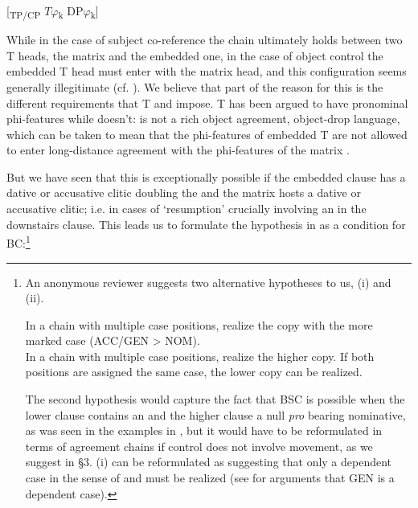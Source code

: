 \documentclass[output=paper]{langsci/langscibook}
\begin{document}
\ea%
    \label{ex:alexiadou:54}
    \textsubscript{} [\textsubscript{TP/CP}    $T\varphi $\textsubscript{k}    DP$\varphi $\textsubscript{k}]  
\z
 
While in the case of subject co-reference the  chain ultimately holds between two T heads, the matrix and the embedded one, in the case of object control the embedded T head must enter  with the matrix  head, and this configuration seems generally illegitimate (cf. \citealt{Kayne1989}). We believe that part of the reason for this is the different requirements that T and  impose. T has been argued to have pronominal phi-features while  doesn’t:  is not a rich object agreement, object-drop language, which can be taken to mean that the phi-features of embedded T are not allowed to enter long-distance agreement with the phi-features of the matrix . 

But we have seen that this is exceptionally possible if the embedded clause has a dative or accusative clitic doubling the  and the matrix  hosts a dative or accusative clitic; i.e. in cases of ‘resumption’ crucially involving an  in the downstairs clause. This leads us to formulate the hypothesis in  as a condition for BC:\footnote{An anonymous reviewer suggests two alternative hypotheses to us, (i) and (ii).

\ea \glt In a chain with multiple case positions, realize the copy with the more marked case (ACC\slash GEN > NOM).\\
\z
\ea \glt In a chain with multiple case positions, realize the higher copy. If both positions are assigned the same case, the lower copy can be realized.\\
\z    

The second hypothesis would capture the fact that BSC is possible when the lower clause contains an  and the higher clause a null \textit{pro} bearing nominative, as was seen in the examples in , but it would have to be reformulated in terms of agreement chains if control does not involve movement, as we suggest in §3. (i) can be reformulated as suggesting that only a dependent case in the sense of \citet{Marantz1991} and \citet{Baker2015} must be realized (see \citealt{Anagnostopoulou2017} for arguments that  GEN is a dependent case).}
\end{document}

